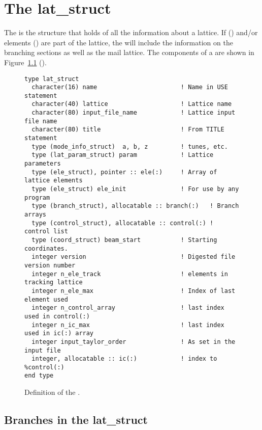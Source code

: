 \chapter{The lat_struct}
\label{c:lat.struct}

The  is the structure that holds of all the information
about a lattice. If  () and/or
 elements () are part of the
lattice, the  will include the information on the
branching sections as well as the mail lattice.
The components of a  are shown in
Figure~\ref{f:lat.struct} ().
\begin{figure}[htb]
\centering
\begin{verbatim}
type lat_struct
  character(16) name                       ! Name in USE statement
  character(40) lattice                    ! Lattice name
  character(80) input_file_name            ! Lattice input file name
  character(80) title                      ! From TITLE statement
  type (mode_info_struct)  a, b, z         ! tunes, etc.
  type (lat_param_struct) param            ! Lattice parameters
  type (ele_struct), pointer :: ele(:)     ! Array of lattice elements
  type (ele_struct) ele_init               ! For use by any program
  type (branch_struct), allocatable :: branch(:)   ! Branch arrays
  type (control_struct), allocatable :: control(:) ! control list
  type (coord_struct) beam_start           ! Starting coordinates.
  integer version                          ! Digested file version number
  integer n_ele_track                      ! elements in tracking lattice
  integer n_ele_max                        ! Index of last element used
  integer n_control_array                  ! last index used in control(:)
  integer n_ic_max                         ! last index used in ic(:) array
  integer input_taylor_order               ! As set in the input file
  integer, allocatable :: ic(:)            ! index to %control(:)
end type
\end{verbatim}
\caption{Definition of the .}
\label{f:lat.struct}
\end{figure}

\section{Branches in the lat_struct}
\label {s:lat.struct}

